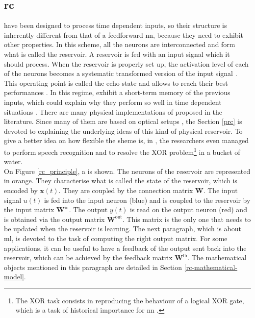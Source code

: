 \subsection{\acrlong{rc}}

\rcer have been designed to process time dependent inputs, so their structure is inherently different from that of a feedforward \gls{nn}, because they need to exhibit other properties. In this scheme, all the neurons are interconnected and form what is called the reservoir. A reservoir is fed with an input signal which it should process. When the reservoir is properly set up, the activation level of each of the neurons becomes a systematic transformed version of the input signal \cite{Jaeger2004}. This operating point is called the echo state and allows \rcer to reach their best performances \cite{Goudarzi2014ACS, JaegerH.2001Tesa}. In this regime, \rcer exhibit a short-term memory of the previous inputs, which could explain why they perform so well in time dependent situations \cite{Jaeger2004}. There are many physical implementations of \rcer proposed in the literature. Since many of them are based on optical setups \cite{VanderSande2017}, the Section \ref{prc} is devoted to explaining the underlying ideas of this kind of physical reservoir. To give a better idea on how flexible the \rc sheme is, in \cite{Fernando2003}, the researchers even managed to perform speech recognition and to resolve the XOR problem\footnote{The XOR task consists in reproducing the behaviour of a logical XOR gate, which is a task of historical importance for \gls{nn} \cite{minsky1969perceptrons}.} in a bucket of water. \\

On Figure \ref{rc_principle}, a \rcer is shown. The neurons of the reservoir are represented in orange. They characterise what is called the state of the reservoir, which is encoded by $\mathbf{x}(t)$. They are coupled by the connection matrix $\mathbf{W}$. The input signal $u(t)$ is fed into the input neuron (blue) and is coupled to the reservoir by the input matrix $\mathbf{W}^{\text{in}}$. The output $y(t)$ is read on the output neuron (red) and is obtained via the output matrix $\mathbf{W}^{\text{out}}$. This matrix is the only one that needs to be updated when the reservoir is learning. The next paragraph, which is about \gls{ml},  is devoted to the task of computing the right output matrix. For some applications, it can be useful to have a feedback of the output sent back into the reservoir, which can be achieved by the feedback matrix $\mathbf{W}^{\text{fb}}$. The mathematical objects mentioned in this paragraph are detailed in Section \ref{rc-mathematical-model}.

